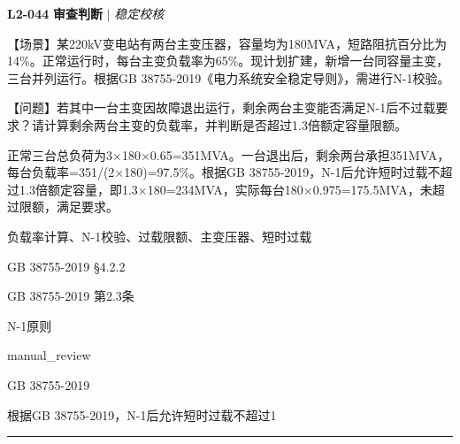 \documentclass[11pt,a4paper]{ctexart}
\begin{document}
\noindent\textbf{L2-044} \hfill \textbf{审查判断} $|$ \textit{稳定校核}
\begin{description}[leftmargin=1.5em,style=nextline,font=\normalfont]
  \item[Q:] 【场景】某220kV变电站有两台主变压器，容量均为180MVA，短路阻抗百分比为14\%。正常运行时，每台主变负载率为65\%。现计划扩建，新增一台同容量主变，三台并列运行。根据GB 38755-2019《电力系统安全稳定导则》，需进行N-1校验。

【问题】若其中一台主变因故障退出运行，剩余两台主变能否满足N-1后不过载要求？请计算剩余两台主变的负载率，并判断是否超过1.3倍额定容量限额。
  \item[A:] 正常三台总负荷为3×180×0.65=351MVA。一台退出后，剩余两台承担351MVA，每台负载率=351/(2×180)=97.5\%。根据GB 38755-2019，N-1后允许短时过载不超过1.3倍额定容量，即1.3×180=234MVA，实际每台180×0.975=175.5MVA，未超过限额，满足要求。
  \item[KW:] 负载率计算、N-1校验、过载限额、主变压器、短时过载
  \item[标准:] GB 38755-2019 §4.2.2
  \item[条款溯源:] GB 38755-2019 第2.3条
  \item[主题:] N-1原则
  \item[评分方式:] manual\_review
  \item[Rubric条款:] GB 38755-2019
  \item[Rubric判据:] 根据GB 38755-2019，N-1后允许短时过载不超过1

\end{description}
\vspace{4pt}
\hrule
\vspace{6pt}
\end{document}
